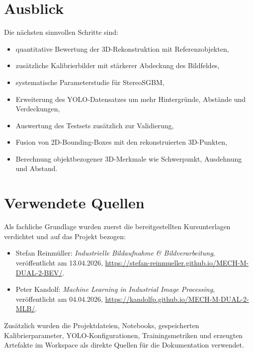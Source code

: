 \section{Ausblick}

Die nächsten sinnvollen Schritte sind:

\begin{itemize}
    \item quantitative Bewertung der 3D-Rekonstruktion mit Referenzobjekten,
    \item zusätzliche Kalibrierbilder mit stärkerer Abdeckung des Bildfeldes,
    \item systematische Parameterstudie für StereoSGBM,
    \item Erweiterung des YOLO-Datensatzes um mehr Hintergründe, Abstände und Verdeckungen,
    \item Auswertung des Testsets zusätzlich zur Validierung,
    \item Fusion von 2D-Bounding-Boxes mit den rekonstruierten 3D-Punkten,
    \item Berechnung objektbezogener 3D-Merkmale wie Schwerpunkt, Ausdehnung und Abstand.
\end{itemize}

\section{Verwendete Quellen}

Als fachliche Grundlage wurden zuerst die bereitgestellten Kursunterlagen verdichtet und auf
das Projekt bezogen:

\begin{itemize}
    \item Stefan Reinmüller: \textit{Industrielle Bildaufnahme \& Bildverarbeitung},
          veröffentlicht am 13.04.2026, \url{https://stefan-reinmueller.github.io/MECH-M-DUAL-2-BEV/}.
    \item Peter Kandolf: \textit{Machine Learning in Industrial Image Processing},
          veröffentlicht am 04.04.2026, \url{https://kandolfp.github.io/MECH-M-DUAL-2-MLB/}.
\end{itemize}

Zusätzlich wurden die Projektdateien, Notebooks, gespeicherten Kalibrierparameter,
YOLO-Konfigurationen, Trainingsmetriken und erzeugten Artefakte im Workspace als direkte
Quellen für die Dokumentation verwendet.
